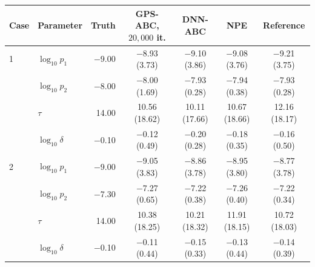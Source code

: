 \begin{tabular}{llrcccc}
\toprule
Case & Parameter & Truth & GPS-ABC, $20{,}000$ it. & DNN-ABC & NPE & Reference \\
\midrule
1 & $\log_{10}p_1$ & $-$9.00 & $-$8.93 (3.73) & $-$9.10 (3.86) & $-$9.08 (3.76) & $-$9.21 (3.75) \\
 & $\log_{10}p_2$ & $-$8.00 & $-$8.00 (1.69) & $-$7.93 (0.28) & $-$7.94 (0.38) & $-$7.93 (0.28) \\
 & $\tau$ & 14.00 & 10.56 (18.62) & 10.11 (17.66) & 10.67 (18.66) & 12.16 (18.17) \\
 & $\log_{10}\delta$ & $-$0.10 & $-$0.12 (0.49) & $-$0.20 (0.28) & $-$0.18 (0.35) & $-$0.16 (0.50) \\
\midrule
2 & $\log_{10}p_1$ & $-$9.00 & $-$9.05 (3.83) & $-$8.86 (3.78) & $-$8.95 (3.80) & $-$8.77 (3.78) \\
 & $\log_{10}p_2$ & $-$7.30 & $-$7.27 (0.65) & $-$7.22 (0.38) & $-$7.26 (0.40) & $-$7.22 (0.34) \\
 & $\tau$ & 14.00 & 10.38 (18.25) & 10.21 (18.32) & 11.91 (18.15) & 10.72 (18.03) \\
 & $\log_{10}\delta$ & $-$0.10 & $-$0.11 (0.44) & $-$0.15 (0.33) & $-$0.13 (0.44) & $-$0.14 (0.39) \\
\bottomrule
\end{tabular}

